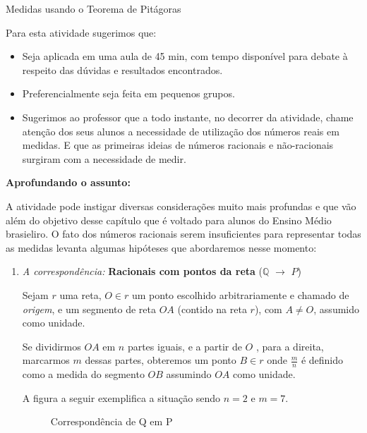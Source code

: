 \begin{sugestions}{Medidas usando o Teorema de Pitágoras}
{
Para esta atividade sugerimos que:
\begin{itemize}
\item {} 
Seja aplicada em uma aula de 45 min, com tempo disponível para debate à respeito das dúvidas e resultados encontrados.

\item {} 
Preferencialmente seja feita em pequenos grupos.

\item {} 
Sugerimos ao professor que a todo instante, no decorrer da atividade, chame atenção dos seus alunos a necessidade de utilização dos números reais em medidas. E que as primeiras ideias de números racionais e não-racionais surgiram com a necessidade de medir.

\end{itemize}

\textbf{Aprofundando o assunto:}

A atividade pode instigar diversas considerações muito mais profundas e que vão além do objetivo desse capítulo que é voltado para alunos do Ensino Médio brasieliro. O fato dos números racionais serem insuficientes para representar todas as medidas levanta algumas hipóteses que abordaremos nesse momento:

\begin{enumerate}[label=\titem{\arabic*)}]
\item \textit{A correspondência:} \textbf{Racionais com pontos da reta} (\(\mathbb{Q}\) \(\to\) \(P\))

Sejam \(r\) uma reta, \(O \in r\) um ponto escolhido arbitrariamente e chamado de \textit{origem}, e um segmento de reta \(OA\) (contido na reta \(r\)), com \(A \neq O\), assumido como unidade.

Se dividirmos \(OA\) em \(n\) partes iguais, e a partir de \(O\) , para a direita, marcarmos \(m\) dessas partes, obteremos um ponto \(B \in r\) onde \(\frac{m}{n}\) é definido como a medida do segmento \(OB\) assumindo \(OA\) como unidade.

A figura a seguir exemplifica a situação sendo \(n=2\) e \(m=7\).

\begin{figure}[H]
\centering
\capstart

\noindent
{}
\caption{Correspondência de Q em P}\label{\detokenize{NO103-5:id5}}\label{\detokenize{NO103-5:id15}}\end{figure}


\end{enumerate}}
\end{sugestions}
